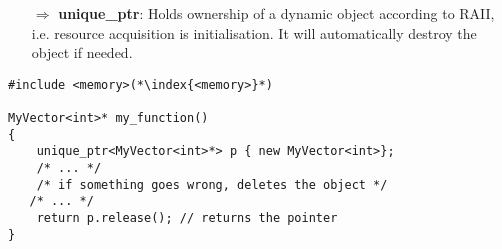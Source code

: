 \documentclass[10pt]{article}
\begin{document}
\begin{enumerate}
\item[$\Rightarrow$] \textbf{unique\_ptr}:
Holds ownership of a dynamic object according to RAII, i.e. resource acquisition is initialisation. It will 
automatically destroy the object if needed.
\end{enumerate}
\begin{lstlisting}
#include <memory>(*\index{<memory>}*)

MyVector<int>* my_function()
{
    unique_ptr<MyVector<int>*> p { new MyVector<int>};
    /* ... */
    /* if something goes wrong, deletes the object */
   /* ... */   
    return p.release(); // returns the pointer
}
\end{lstlisting}
%
%
\end{document}
